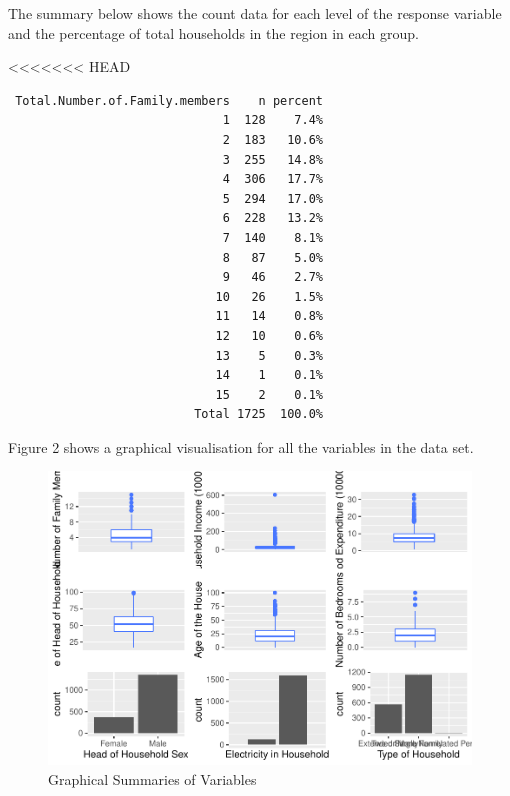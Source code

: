 \documentclass[
]{article}
\begin{document}
The summary below shows the count data for each level of the response
variable and the percentage of total households in the region in each
group.

<<<<<<< HEAD
\begin{verbatim}
 Total.Number.of.Family.members    n percent
                              1  128    7.4%
                              2  183   10.6%
                              3  255   14.8%
                              4  306   17.7%
                              5  294   17.0%
                              6  228   13.2%
                              7  140    8.1%
                              8   87    5.0%
                              9   46    2.7%
                             10   26    1.5%
                             11   14    0.8%
                             12   10    0.6%
                             13    5    0.3%
                             14    1    0.1%
                             15    2    0.1%
                          Total 1725  100.0%
\end{verbatim}

Figure 2 shows a graphical visualisation for all the variables in the
data set.

\begin{figure}[H]

{\centering \includegraphics[width=0.8\linewidth]{Group_01_Project2_demo_files/figure-latex/all summaries-1} 

}

\caption{Graphical Summaries of Variables}\label{fig:all summaries}
\end{figure}
\end{document}
